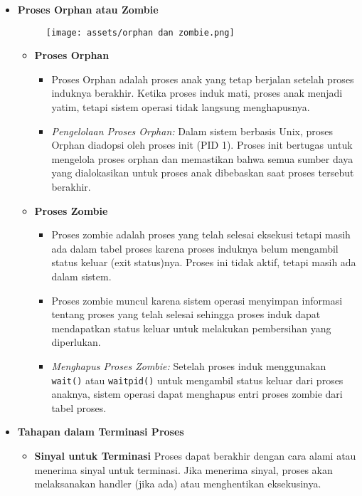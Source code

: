 \documentclass[12pt]{article}
\begin{document}
\begin{itemize}
\begin{itemize}
    \item \textbf{Proses Orphan atau Zombie}
    \begin{figure} [h]
        \centering
        \texttt{[image: assets/orphan dan zombie.png]}
        \label{fig:diagram}
        \end{figure}
    \begin{itemize}
        \item \textbf{Proses Orphan}
        \begin{itemize}
            \item Proses Orphan adalah proses anak yang tetap berjalan setelah proses induknya berakhir. Ketika proses induk mati, proses anak menjadi yatim, tetapi sistem operasi tidak langsung menghapusnya.
            \item \textit{Pengelolaan Proses Orphan:}  
            Dalam sistem berbasis Unix, proses Orphan diadopsi oleh proses init (PID 1). Proses init bertugas untuk mengelola proses orphan dan memastikan bahwa semua sumber daya yang dialokasikan untuk proses anak dibebaskan saat proses tersebut berakhir.
        \end{itemize}
        \item \textbf{Proses Zombie}
        \begin{itemize}
            \item Proses zombie adalah proses yang telah selesai eksekusi tetapi masih ada dalam tabel proses karena proses induknya belum mengambil status keluar (exit status)nya. Proses ini tidak aktif, tetapi masih ada dalam sistem.
            \item Proses zombie muncul karena sistem operasi menyimpan informasi tentang proses yang telah selesai sehingga proses induk dapat mendapatkan status keluar untuk melakukan pembersihan yang diperlukan.
            \item \textit{Menghapus Proses Zombie:}  
            Setelah proses induk menggunakan \texttt{wait()} atau \texttt{waitpid()} untuk mengambil status keluar dari proses anaknya, sistem operasi dapat menghapus entri proses zombie dari tabel proses.
        \end{itemize}
    \end{itemize}

    \item \textbf{Tahapan dalam Terminasi Proses}
    \begin{itemize}
        \item \textbf{Sinyal untuk Terminasi}  
        Proses dapat berakhir dengan cara alami atau menerima sinyal untuk terminasi. Jika menerima sinyal, proses akan melaksanakan handler (jika ada) atau menghentikan eksekusinya.
        

\end{itemize}
\end{itemize}
\end{itemize}
\end{document}
